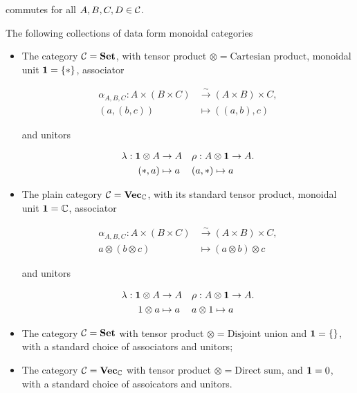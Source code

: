 \begin{defn}
\begin{enumerate}
commutes for all $A,B,C,D\in {\mathcal C}$.
\end{enumerate}
\end{defn}

\begin{ex}
The following collections of data form monoidal categories

\begin{itemize}
\item The category ${\mathcal C}={\bf Set}$, with tensor product $\otimes = \text{Cartesian product}$, monoidal unit ${\mathbf 1} =\{*\}$, associator

\begin{align*}
\alpha_{A,B,C}: A\times (B\times C) &\xrightarrow{\sim}(A\times B)\times C,\\
(a,(b,c))&\mapsto ((a,b),c)
\end{align*}

and unitors 

\begin{align*}
\lambda: {\mathbf 1} \otimes A &\to A && \rho:  A\otimes {\mathbf 1} \to A.\\
(*, a)&\mapsto a && (a,*)\mapsto a
\end{align*}

\item The plain category ${\mathcal C}={\bf Vec}_{{\mathbb C}}$, with its standard tensor product, monoidal unit ${\mathbf 1} ={\mathbb C}$, associator

\begin{align*}
\alpha_{A,B,C}: A\times (B\times C) &\xrightarrow{\sim}(A\times B)\times C,\\
a\otimes (b\otimes c ) & \mapsto (a\otimes b)\otimes c
\end{align*}

and unitors 

\begin{align*}
\lambda: {\mathbf 1} \otimes A &\to A && \rho:  A\otimes {\mathbf 1} \to A.\\
1\otimes a &\mapsto  a && a\otimes 1 \mapsto a
\end{align*}

\item The category ${\mathcal C}={\bf Set}$ with tensor product $\otimes=\text{Disjoint union}$ and ${\mathbf 1}=\{\}$, with a standard choice of associators and unitors;

\item The category ${\mathcal C}={\bf Vec}_{{\mathbb C}}$ with tensor product $\otimes = \text{Direct sum}$, and ${\mathbf 1} = 0$, with a standard choice of assoicators and unitors.
\end{itemize}
\end{ex}

